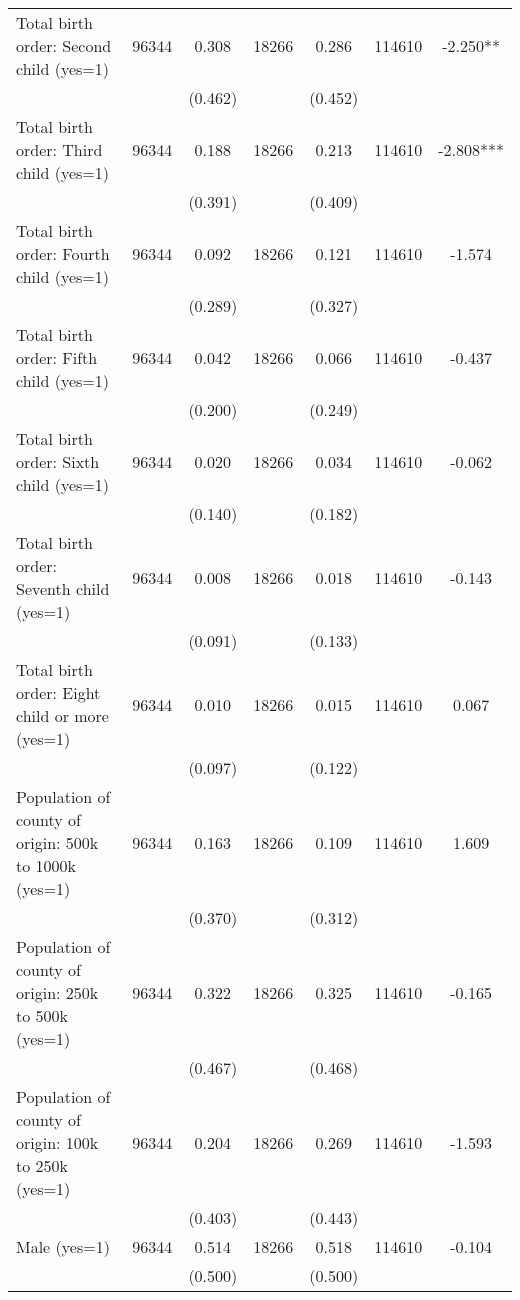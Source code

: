 \begin{tabular}{@{\extracolsep{5pt}}lcccccc}
Total birth order: Second child (yes=1)   & 96344    & 0.308    & 18266    & 0.286    & 114610    & -2.250**   \\
 &   & (0.462)  &   & (0.452)  &   &  \\ [1ex]
Total birth order: Third child (yes=1)   & 96344    & 0.188    & 18266    & 0.213    & 114610    & -2.808***   \\
 &   & (0.391)  &   & (0.409)  &   &  \\ [1ex]
Total birth order: Fourth child (yes=1)   & 96344    & 0.092    & 18266    & 0.121    & 114610    & -1.574   \\
 &   & (0.289)  &   & (0.327)  &   &  \\ [1ex]
Total birth order: Fifth child (yes=1)   & 96344    & 0.042    & 18266    & 0.066    & 114610    & -0.437   \\
 &   & (0.200)  &   & (0.249)  &   &  \\ [1ex]
Total birth order: Sixth child (yes=1)   & 96344    & 0.020    & 18266    & 0.034    & 114610    & -0.062   \\
 &   & (0.140)  &   & (0.182)  &   &  \\ [1ex]
Total birth order: Seventh child (yes=1)   & 96344    & 0.008    & 18266    & 0.018    & 114610    & -0.143   \\
 &   & (0.091)  &   & (0.133)  &   &  \\ [1ex]
Total birth order: Eight child or more (yes=1)   & 96344    & 0.010    & 18266    & 0.015    & 114610    & 0.067   \\
 &   & (0.097)  &   & (0.122)  &   &  \\ [1ex]
Population of county of origin: 500k to 1000k (yes=1)   & 96344    & 0.163    & 18266    & 0.109    & 114610    & 1.609   \\
 &   & (0.370)  &   & (0.312)  &   &  \\ [1ex]
Population of county of origin: 250k to 500k (yes=1)   & 96344    & 0.322    & 18266    & 0.325    & 114610    & -0.165   \\
 &   & (0.467)  &   & (0.468)  &   &  \\ [1ex]
Population of county of origin: 100k to 250k (yes=1)   & 96344    & 0.204    & 18266    & 0.269    & 114610    & -1.593   \\
 &   & (0.403)  &   & (0.443)  &   &  \\ [1ex]
Male (yes=1)   & 96344    & 0.514    & 18266    & 0.518    & 114610    & -0.104   \\
 &   & (0.500)  &   & (0.500)  &   &  \\ [1ex]

\end{tabular}
